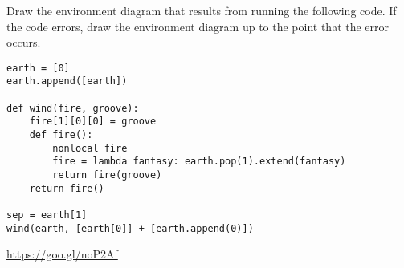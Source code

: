 \begin{blocksection}
\question Draw the environment diagram that results from running the following code. If the code errors, draw the environment diagram up to the point that the error occurs.

\begin{lstlisting}
earth = [0]
earth.append([earth])

def wind(fire, groove):
    fire[1][0][0] = groove
    def fire():
        nonlocal fire
        fire = lambda fantasy: earth.pop(1).extend(fantasy)
        return fire(groove)
    return fire()

sep = earth[1]		
wind(earth, [earth[0]] + [earth.append(0)])
\end{lstlisting}

\begin{solution}[1in]
\url{https://goo.gl/noP2Af}
\end{solution}
\end{blocksection}
